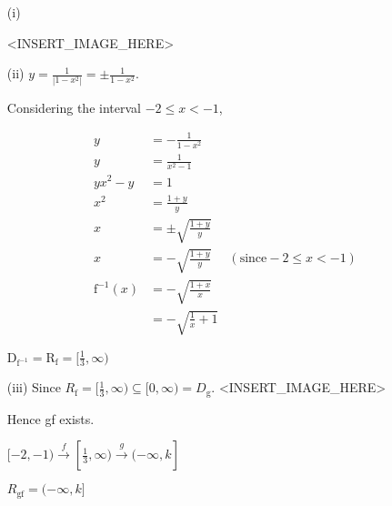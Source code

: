 \item {}
\begin{enumerate}
\item[(i)]  
\noindent \begin{center}
<INSERT\_IMAGE\_HERE>
\par\end{center}
\item[(ii)]  $y=\frac{1}{\left|1-x^{2}\right|}=\pm\frac{1}{1-x^{2}}$. 

Considering the interval $-2\le x<-1$, 

\begin{align*}
y & =-\frac{1}{1-x^{2}}\\
y & =\frac{1}{x^{2}-1}\\
yx^{2}-y & =1\\
x^{2} & =\frac{1+y}{y}\\
x & =\pm\sqrt{\frac{1+y}{y}}\\
x & =-\sqrt{\frac{1+y}{y}} & (\text{since}-2\le x<-1)\\
\text{f}^{-1}(x) & =-\sqrt{\frac{1+x}{x}}\\
 & =-\sqrt{\frac{1}{x}+1}
\end{align*}

$\text{D}_{\text{f}^{-1}}=\text{R}_{\text{f}}=[\frac{1}{3},\infty)$
\item[(iii)]  Since $R_{\text{f}}=[\tfrac{1}{3},\infty)\subseteq[0,\infty)=D_{\text{g}}$.
<INSERT\_IMAGE\_HERE>

Hence gf exists.

$[-2,-1)\xrightarrow{f}[\tfrac{1}{3},\infty)\xrightarrow{g}(-\infty,k]$

$R_{\text{gf}}=(-\infty,k]$
\end{enumerate}